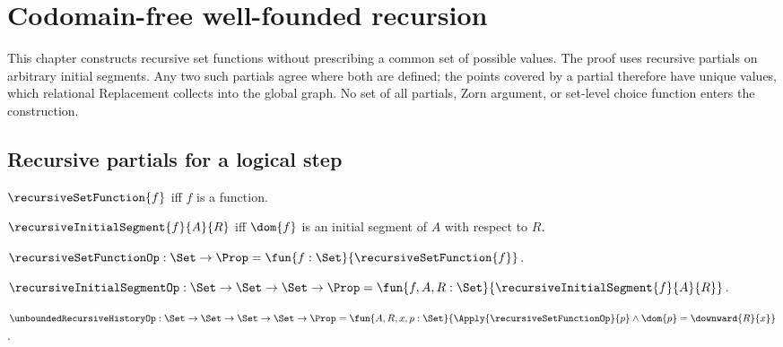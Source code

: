 



\section{Codomain-free well-founded recursion}

This chapter constructs recursive set functions without prescribing a common
set of possible values.  The proof uses recursive partials on arbitrary
initial segments.  Any two such partials agree where both are defined; the
points covered by a partial therefore have unique values, which relational
Replacement collects into the global graph.  No set of all partials, Zorn
argument, or set-level choice function enters the construction.

\subsection{Recursive partials for a logical step}

\begin{definition}\label{recursive_set_function}
    $\recursiveSetFunction{f}$ iff $f$ is a function.
\end{definition}

\begin{definition}\label{recursive_initial_segment}
    $\recursiveInitialSegment{f}{A}{R}$ iff
        $\dom{f}$ is an initial segment of $A$ with respect to $R$.
\end{definition}

\begin{definition}\label{recursive_set_function_op}
    $\recursiveSetFunctionOp:\Set\to\Prop
        =\fun{f:\Set}{\recursiveSetFunction{f}}$.
\end{definition}

\begin{definition}\label{recursive_initial_segment_op}
    $\recursiveInitialSegmentOp:\Set\to\Set\to\Set\to\Prop
        =\fun{f,A,R:\Set}{\recursiveInitialSegment{f}{A}{R}}$.
\end{definition}

\begin{definition}\label{unbounded_recursive_history_op}
    $\unboundedRecursiveHistoryOp:
        \Set\to\Set\to\Set\to\Set\to\Prop
        =\fun{A,R,x,p:\Set}{
                        \Apply{\recursiveSetFunctionOp}{p}\land
                        \dom{p}=\downward{R}{x}}$.
\end{definition}


